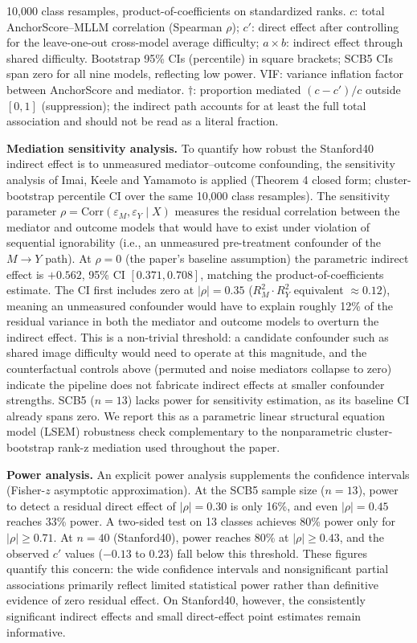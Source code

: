 \documentclass[a4paper,fleqn]{cas-sc}
\begin{document}
\begin{table}[h]
\vspace{2pt}
{\footnotesize 10{,}000 class resamples, product-of-coefficients on standardized ranks. $c$: total AnchorScore--MLLM correlation (Spearman $\rho$); $c'$: direct effect after controlling for the leave-one-out cross-model average difficulty; $a\times b$: indirect effect through shared difficulty. Bootstrap 95\% CIs (percentile) in square brackets; SCB5 CIs span zero for all nine models, reflecting low power. VIF: variance inflation factor between AnchorScore and mediator. $\dagger$: proportion mediated $(c-c')/c$ outside $[0,1]$ (suppression); the indirect path accounts for at least the full total association and should not be read as a literal fraction.}
\end{table}

\textbf{Mediation sensitivity analysis.}
To quantify how robust the Stanford40 indirect effect is to unmeasured mediator--outcome confounding, the sensitivity analysis of Imai, Keele and Yamamoto is applied \cite{imai2010sensitivity} (Theorem 4 closed form; cluster-bootstrap percentile CI over the same 10{,}000 class resamples). The sensitivity parameter $\rho = \mathrm{Corr}(\varepsilon_M, \varepsilon_Y \mid X)$ measures the residual correlation between the mediator and outcome models that would have to exist under violation of sequential ignorability (i.e., an unmeasured pre-treatment confounder of the $M\rightarrow Y$ path). At $\rho=0$ (the paper's baseline assumption) the parametric indirect effect is $+0.562$, 95\% CI $[0.371, 0.708]$, matching the product-of-coefficients estimate. The CI first includes zero at $|\rho|=0.35$ ($R^2_M \cdot R^2_Y$ equivalent $\approx 0.12$), meaning an unmeasured confounder would have to explain roughly 12\% of the residual variance in both the mediator and outcome models to overturn the indirect effect. This is a non-trivial threshold: a candidate confounder such as shared image difficulty would need to operate at this magnitude, and the counterfactual controls above (permuted and noise mediators collapse to zero) indicate the pipeline does not fabricate indirect effects at smaller confounder strengths. SCB5 ($n=13$) lacks power for sensitivity estimation, as its baseline CI already spans zero. We report this as a parametric linear structural equation model (LSEM) robustness check complementary to the nonparametric cluster-bootstrap rank-z mediation used throughout the paper.

\textbf{Power analysis.}
An explicit power analysis supplements the confidence intervals (Fisher-$z$ asymptotic approximation). At the SCB5 sample size ($n=13$), power to detect a residual direct effect of $|\rho|=0.30$ is only 16\%, and even $|\rho|=0.45$ reaches 33\% power. A two-sided test on 13 classes achieves 80\% power only for $|\rho|\geq0.71$. At $n=40$ (Stanford40), power reaches 80\% at $|\rho|\geq0.43$, and the observed $c'$ values ($-0.13$ to $0.23$) fall below this threshold. These figures quantify this concern: the wide confidence intervals and nonsignificant partial associations primarily reflect limited statistical power rather than definitive evidence of zero residual effect. On Stanford40, however, the consistently significant indirect effects and small direct-effect point estimates remain informative.
\end{document}
